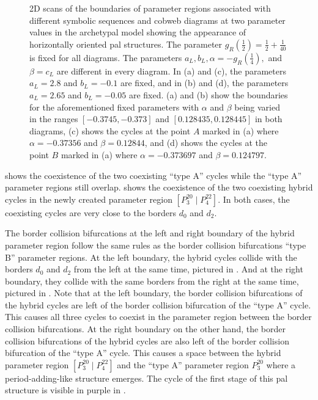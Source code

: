 \begin{figure}
{		\label{fig:add.change.appa.vert.cobweb.B}
	}
	\caption[2D scans of the boundaries of parameter regions associated with different symbolic sequences and cobweb diagrams at two parameter values in the archetypal model showing the appearance of horizontally oriented period-adding-like structures]{
		2D scans of the boundaries of parameter regions associated with different symbolic sequences and cobweb diagrams at two parameter values in the archetypal model showing the appearance of horizontally oriented \gls{pal} structures.
		The parameter $g_R\left(\frac{1}{2}\right) = \frac{1}{2} + \frac{1}{40}$ is fixed for all diagrams.
		The parameters $a_L, b_L, \alpha = -g_R\left(\frac{1}{4}\right),$ and $\beta = c_L$ are different in every diagram.
		In (a) and (c), the parameters $a_L = 2.8$ and $b_L = -0.1$ are fixed, and in (b) and (d), the parameters $a_L = 2.65$ and $b_L = -0.05$ are fixed.
		(a) and (b) show the boundaries for the aforementioned fixed parameters with $\alpha$ and $\beta$ being varied in the ranges $[-0.3745, -0.373]$ and $[0.128435, 0.128445]$ in both diagrams,
		(c) shows the cycles at the point $A$ marked in (a) where $\alpha = -0.37356$ and $\beta = 0.12844$,
		and (d) shows the cycles at the point $B$ marked in (a) where $\alpha = -0.373697$ and $\beta = 0.124797$.
	}
\end{figure}

 shows the coexistence of the two coexisting ``type A'' cycles while the ``type A'' parameter regions still overlap.
 shows the coexistence of the two coexisting hybrid cycles in the newly created parameter region $\left[P^{20}_3 \mid P^{22}_4\right]$.
In both cases, the coexisting cycles are very close to the borders $d_0$ and $d_2$.

The border collision bifurcations at the left and right boundary of the hybrid parameter region follow the same rules as the border collision bifurcations ``type B'' parameter regions.
At the left boundary, the hybrid cycles collide with the borders $d_0$ and $d_2$ from the left at the same time, pictured in .
And at the right boundary, they collide with the same borders from the right at the same time, pictured in .
Note that at the left boundary, the border collision bifurcations of the hybrid cycles are left of the border collision bifurcation of the ``type A'' cycle.
This causes all three cycles to coexist in the parameter region between the border collision bifurcations.
At the right boundary on the other hand, the border collision bifurcations of the hybrid cycles are also left of the border collision bifurcation of the ``type A'' cycle.
This causes a space between the hybrid parameter region $\left[P^{20}_3 \mid P^{22}_4\right]$ and the ``type A'' parameter region $P^{20}_3$ where a period-adding-like structure emerges.
The cycle of the first stage of this \gls{pal} structure is visible in purple in .

